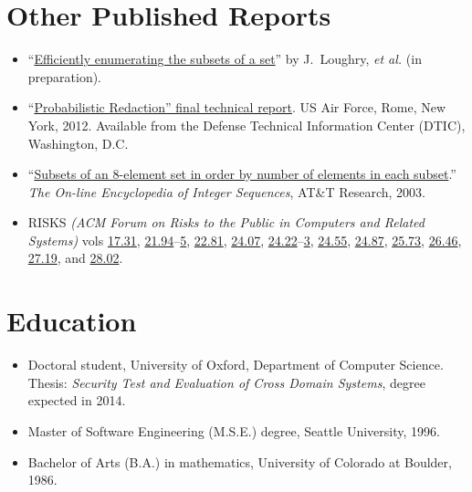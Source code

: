 \documentclass[12pt,twoside,letterpaper]{article}
\begin{document}
\section*{Other Published Reports}
\vspace{-2mm}
\begin{itemize}
	\item ``\href{http://www.call-with-current-continuation.com/papers/subset.pdf}%
{Efficiently enumerating the subsets of a set}'' by J.\ Loughry,
{\it et al.} (in preparation).\vspace{-1mm}

	\item ``\href{http://call-with-current-continuation.com/papers/Loughry2011.pdf}%
{Probabilistic Redaction'' final technical report}. US Air Force, Rome,
New York, 2012. Available from the Defense Technical Information Center
(DTIC), Washington, D.C.\vspace{-1mm}

	\item ``\href{http://oeis.org/A047869}{Subsets of an 8-element set
		in order by number of elements in each subset}.'' \emph{The On-line
		Encyclopedia of Integer Sequences}, AT\&T Research, 2003.\vspace{-1mm}

	\item RISKS \emph{(ACM Forum on Risks to the Public in Computers
		and Related Systems)} vols
		\href{http://catless.ncl.ac.uk/Risks/17.31.html}{17.31},
		\href{http://catless.ncl.ac.uk/Risks/21.94.html}{21.94}--\href{http://catless.ncl.ac.uk/Risks/21.95.html}{5},
		\href{http://catless.ncl.ac.uk/Risks/21.81.html}{22.81},
		\href{http://catless.ncl.ac.uk/Risks/24.07.html}{24.07},
		\href{http://catless.ncl.ac.uk/Risks/24.22.html}{24.22}--\href{http://catless.ncl.ac.uk/Risks/24.23.html}{3},
		\href{http://catless.ncl.ac.uk/Risks/24.55.html}{24.55},
		\href{http://catless.ncl.ac.uk/Risks/24.87.html}{24.87},
		\href{http://catless.ncl.ac.uk/Risks/25.73.html}{25.73},
		\href{http://catless.ncl.ac.uk/Risks/26.46.html}{26.46},
		\href{http://catless.ncl.ac.uk/Risks/27.19.html}{27.19},
		and \href{http://catless.ncl.ac.uk/Risks/28.02.html}{28.02}.
\end{itemize}

\vspace{-8mm}
\section*{Education}
\vspace{-2mm}
\begin{itemize}
	\item Doctoral student, University of Oxford, Department of
		Computer Science. Thesis: \emph{Security Test and
		Evaluation of Cross Domain Systems}, degree expected in 2014.\vspace{-1mm}
	\item Master of Software Engineering (M.S.E.) degree, Seattle University, 1996.\vspace{-1mm}
	\item Bachelor of Arts (B.A.) in mathematics, University of Colorado at Boulder, 1986.
\end{itemize}
\end{document}
